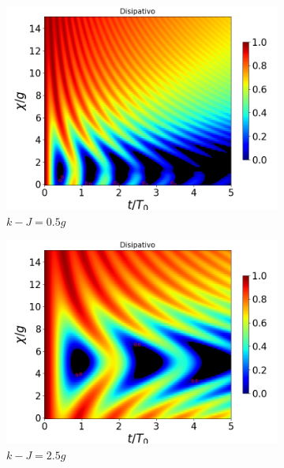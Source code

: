 \begin{figure}[h]
    \begin{subfigure}{0.49\textwidth}
        \includegraphics[width=\textwidth]{figuras/ch4/concu/chi/eg0+ge0 d=0.0g k=0.5g J=0.0g gamma=0.25g concu chi dis.png}
        \caption{$k-J=0.5g$}
        \label{fig4:concu x k1}
    \end{subfigure}
    \hfill
    \begin{subfigure}{0.49\textwidth}
        \includegraphics[width=\textwidth]{figuras/ch4/concu/chi/eg0+ge0 d=0.0g k=2.5g J=0.0g gamma=0.25g concu chi dis.png}
        \caption{$k-J=2.5g$}
        \label{fig4:concu x k2}
    \end{subfigure}
    \caption{}
    \label{fig4:concu x params}
\end{figure}
